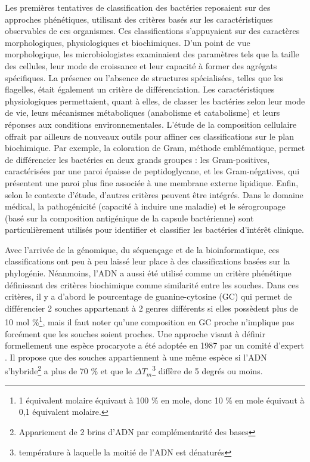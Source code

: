 Les premières tentatives de classification des bactéries reposaient sur des approches phénétiques, utilisant des critères basés sur les caractéristiques observables de ces organismes. Ces classifications s'appuyaient sur des caractères morphologiques, physiologiques et biochimiques.
D'un point de vue morphologique, les microbiologistes examinaient des paramètres tels que la taille des cellules, leur mode de croissance et leur capacité à former des agrégats spécifiques. La présence ou l'absence de structures spécialisées, telles que les flagelles, était également un critère de différenciation. 
Les caractéristiques physiologiques permettaient, quant à elles, de classer les bactéries selon leur mode de vie, leurs mécanismes métaboliques (anabolisme et catabolisme) et leurs réponses aux conditions environnementales.
L'étude de la composition cellulaire offrait par ailleurs de nouveaux outils pour affiner ces classifications sur le plan biochimique. Par exemple, la coloration de Gram, méthode emblématique, permet de différencier les bactéries en deux grands groupes : les Gram-positives, caractérisées par une paroi épaisse de peptidoglycane, et les Gram-négatives, qui présentent une paroi plus fine associée à une membrane externe lipidique.
Enfin, selon le contexte d’étude, d'autres critères peuvent être intégrés. Dans le domaine médical, la pathogénicité (capacité à induire une maladie) et le sérogroupage (basé sur la composition antigénique de la capsule bactérienne) sont particulièrement utilisés pour identifier et classifier les bactéries d'intérêt clinique.

Avec l'arrivée de la génomique, du séquençage et de la bioinformatique, ces classifications ont peu à peu laissé leur place à des classifications basées sur la phylogénie. Néanmoins, l'ADN a aussi été utilisé comme un critère phénétique définissant des critères biochimique comme similarité entre les souches. 
Dans ces critères, il y a d'abord le pourcentage de guanine-cytosine (GC) qui permet de différencier 2 souches appartenant à 2 genres différents si elles possèdent plus de 10 mol \%\footnote{1 équivalent molaire équivaut à 100 \% en mole, donc 10 \% en mole équivaut à 0,1 équivalent molaire.}, mais il faut noter qu'une composition en GC proche n'implique pas forcément que les souches soient proches. 
Une approche visant à définir formellement une espèce procaryote a été adoptée en 1987 par un comité d'expert \cite{moore_report_1987}. Il propose que des souches appartiennent à une même espèce si l'ADN s'hybride\footnote{Appariement de 2 brins d'ADN par complémentarité des bases} a plus de 70 \% et que le $\Delta T_m$\footnote{température à laquelle la moitié de l'ADN est dénaturés} diffère de 5 degrés ou moins.

